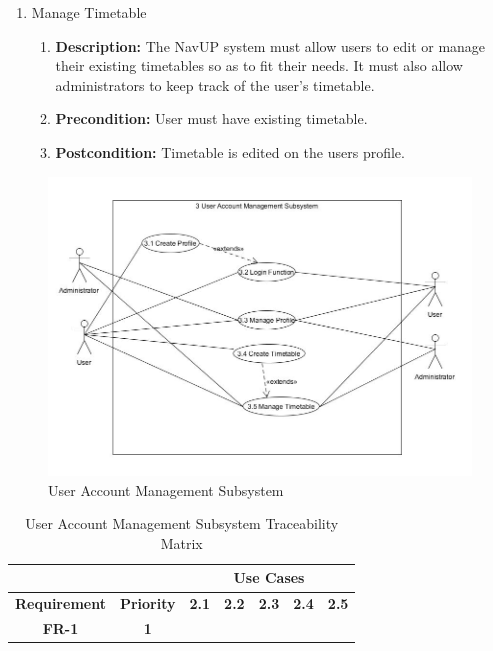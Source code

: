 \documentclass{article}
\begin{document}
\begin{enumerate}
\begin{enumerate}
		\item Manage Timetable
		\begin{enumerate}
			\item \textbf{Description:} The NavUP system must allow users to edit or manage their existing timetables so as to fit their needs. It must also allow administrators to keep track of the user’s timetable. 
			\item \textbf{Precondition:} User must have existing timetable.
			\item \textbf{Postcondition:} Timetable is edited on the users profile.\newline
		\end{enumerate}
	\end{enumerate}
	\begin{figure}[H]
		\includegraphics[scale=0.5]{User_Account_Management.JPG}
		\caption{User Account Management Subsystem}	
	\end{figure}
	\begin{table}[H]
\centering
\caption{User Account Management Subsystem Traceability Matrix}
\label{my-label}
\begin{tabular}{|c|c|c|c|c|c|c|}
\hline
\multicolumn{2}{|c|}{}                           & \multicolumn{5}{c|}{\textbf{Use Cases}}                                  \\ \hline
\textbf{Requirement}     & \textbf{Priority}     & \textbf{2.1} & \textbf{2.2} & \textbf{2.3} & \textbf{2.4} & \textbf{2.5} \\ \hline
\textbf{FR-1}            & \textbf{1}            & \textbf{}    & \textbf{}    & \textbf{}    & \textbf{}    & \textbf{}    \\ \hline

\end{tabular}
\end{table}
\end{enumerate}
\end{document}
